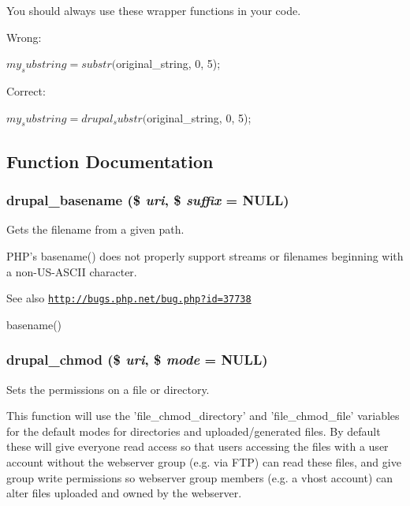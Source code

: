 You should always use these wrapper functions in your code.

Wrong: 
\begin{DoxyCode}
   $my_substring = substr($original_string, 0, 5);
\end{DoxyCode}


Correct: 
\begin{DoxyCode}
   $my_substring = drupal_substr($original_string, 0, 5);
\end{DoxyCode}
 

\subsection{Function Documentation}
\hypertarget{group__php__wrappers_ga0125d5e205f50be86146a8df58c2bc5f}{
\subsubsection[{drupal\_\-basename}]{\setlength{\rightskip}{0pt plus 5cm}drupal\_\-basename (\$ {\em uri}, \/  \$ {\em suffix} = {\ttfamily NULL})}}
\label{group__php__wrappers_ga0125d5e205f50be86146a8df58c2bc5f}
Gets the filename from a given path.

PHP's basename() does not properly support streams or filenames beginning with a non-\/US-\/ASCII character.

\begin{DoxySeeAlso}{See also}
\href{http://bugs.php.net/bug.php?id=37738}{\tt http://bugs.php.net/bug.php?id=37738} 

basename() 
\end{DoxySeeAlso}
\hypertarget{group__php__wrappers_ga5fc93f1c4e81ea4f5b1b32775fca489c}{
\subsubsection[{drupal\_\-chmod}]{\setlength{\rightskip}{0pt plus 5cm}drupal\_\-chmod (\$ {\em uri}, \/  \$ {\em mode} = {\ttfamily NULL})}}
\label{group__php__wrappers_ga5fc93f1c4e81ea4f5b1b32775fca489c}
Sets the permissions on a file or directory.

This function will use the 'file\_\-chmod\_\-directory' and 'file\_\-chmod\_\-file' variables for the default modes for directories and uploaded/generated files. By default these will give everyone read access so that users accessing the files with a user account without the webserver group (e.g. via FTP) can read these files, and give group write permissions so webserver group members (e.g. a vhost account) can alter files uploaded and owned by the webserver.

